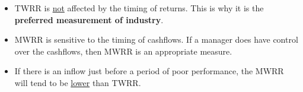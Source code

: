 \documentclass[../notes_compiled.tex]{subfiles}
\begin{document}
\begin{itemize}
{\begin{itemize}
\item[] \textbf{TWRR}
\begin{itemize}
\item[] Compounding two holding periods of a year, we obtain the following.
\begin{align*}
HPR_{1}&=\frac{120+2}{100}-1 = 22\%, \\
HPR_{2}&=\frac{2\cdot130 + 2\cdot2}{2\cdot120}-1 = 10\%.
\end{align*}
\item[] Taking the geometric mean,
\begin{align*}
\sqrt[2]{(1+0.22) \times (1+0.10)} -1 = 15.84\%,
\end{align*}
\item[] so this is the TWRR for this example.
\end{itemize}
\end{itemize}
}
\item TWRR is \underline{not} affected by the timing of returns.  This is why it is the \textbf{preferred measurement of industry}.
\item MWRR is sensitive to the timing of cashflows. If a manager does have control over the cashflows, then MWRR is an appropriate measure.
\item If there is an inflow just before a period of poor performance, the MWRR will tend to be \underline{lower} than TWRR.
\end{itemize}
\end{document}

